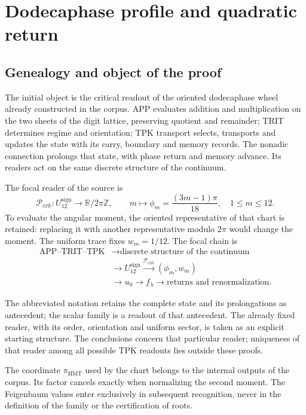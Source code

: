 \section{Dodecaphase profile and quadratic return}
\label{hmtfg:fragmento:perfil-dodecafasico-y-retorno-cuadratico}

\subsection{Genealogy and object of the proof}
\label{hmtfg:desarrollo:1}

The initial object is the critical readout of the oriented dodecaphase wheel already constructed in the corpus. APP evaluates addition and multiplication on the two sheets of the digit lattice, preserving quotient and remainder; TRIT determines regime and orientation; TPK transport selects, transports and updates the state with its carry, boundary and memory records. The nonadic connection prolongs that state, with phase return and memory advance. Its readers act on the same discrete structure of the continuum.

The focal reader of the source is
\[
\mathcal P_{\mathrm{crit}}:U_{12}^{\mathrm{sign}}\longrightarrow
\mathbb R/2\pi\mathbb Z,\qquad
m\longmapsto\phi_m=\frac{(3m-1)\pi}{18},\quad 1\le m\le12.
\]
To evaluate the angular moment, the oriented representative of that chart is retained: replacing it with another representative modulo \(2\pi\) would change the moment. The uniform trace fixes \(w_m=1/12\). The focal chain is
\[\begin{aligned}
\text{APP–TRIT–TPK}&\longrightarrow
\text{discrete structure of the continuum}\\ &\longrightarrow U_{12}^{\mathrm{sign}}
\xrightarrow{\mathcal P_{\mathrm{crit}}}(\phi_m,w_m)
\\ &\longrightarrow u_0\longrightarrow f_\lambda
\longrightarrow\text{returns and renormalization}.
\end{aligned}\]

The abbreviated notation retains the complete state and its prolongations as antecedent; the scalar family is a readout of that antecedent. The already fixed reader, with its order, orientation and uniform sector, is taken as an explicit starting structure. The conclusions concern that particular reader; uniqueness of that reader among all possible TPK readouts lies outside these proofs.

The coordinate \(\pi_{\mathrm{HMT}}\) used by the chart belongs to the internal outputs of the corpus. Its factor cancels exactly when normalizing the second moment. The Feigenbaum values enter exclusively in subsequent recognition, never in the definition of the family or the certification of roots.


